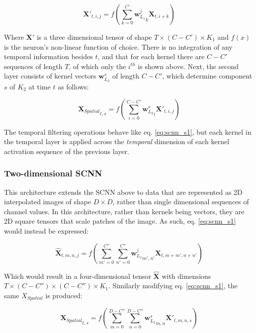 \documentclass[fleqn,10pt]{wlscirep}
\begin{document}
\begin{equation} \label{eq:scnn_s1}
  \boldsymbol{X'}_{t, i, j} = f\left(\sum_{k=0}^{C'} {\boldsymbol{w}_{L_1}^j}_k \boldsymbol{X}_{t,i+k}\right)
\end{equation}

Where $\boldsymbol{X'}$ is a three dimensional tensor of shape $T \times (C-C') \times K_1$ and $f(x)$ is the neuron's non-linear function of choice. There is no integration of any temporal information besides $t$, and that for each kernel there are $C-C'$ sequences of length $T$, of which only the $i^{th}$ is shown above. Next, the second layer consists of kernel vectors $\boldsymbol{w}_{L_2}^s$ of length $C-C'$, which determine component $s$ of $K_2$ at time $t$ as follows:

\begin{equation} \label{eq:scnn_s2}
  {\boldsymbol{X}_{Spatial}}_{t, s} = f\left(\sum_{i=0}^{C-C'}{\boldsymbol{w}_{L_2}^s}_i \boldsymbol{X'}_{t, i, j}\right)
\end{equation}

The temporal filtering operations behave like eq. \ref{eq:scnn_s1}, but each kernel in the temporal layer is applied across the {\em temporal} dimension of each kernel activation sequence of the previous layer.

\subsubsection*{Two-dimensional SCNN}

This architecture extends the SCNN above to data that are represented as 2D interpolated images of shape $D \times D$, rather than single dimensional sequences of channel values. In this architecture, rather than kernels being vectors, they are 2D square tensors that scale patches of the image. As such, eq. \ref{eq:scnn_s1} would instead be expressed:

\begin{equation} \label{eq:s2dcnn_s1}
  \boldsymbol{\hat{X}}_{t, m, n, j} = f\left(\sum_{m'=0}^{C''} \sum_{n'=0}^{C''} {\boldsymbol{w}_{L_1}^j}_{m', n'} \boldsymbol{X}_{t,m+m',n+n'}\right)
\end{equation}

Which would result in a four-dimensional tensor $\boldsymbol{\hat{X}}$ with dimensions $T \times (C-C'') \times (C-C'') \times K_1$. Similarly modifying eq. \ref{eq:scnn_s1}, the same $X_{Spatial}$ is produced:

\begin{equation} \label{eq:scnn_s2}
  {\boldsymbol{X}_{Spatial}}_{t, s} = f\left(\sum_{m=0}^{D-C''}\sum_{n=0}^{D-C''}{\boldsymbol{w}_{L_2}^s}_{m,n} \boldsymbol{X'}_{t, m, n, s}\right)
\end{equation}
\end{document}
